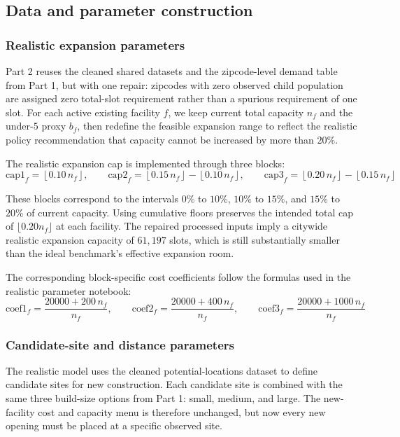 \documentclass[11pt]{article}
\newcommand{\1}{\mathbb{I}}
\begin{document}
\subsection{Data and parameter construction}

\subsubsection{Realistic expansion parameters}

Part 2 reuses the cleaned shared datasets and the zipcode-level demand table from Part 1, but with one repair: zipcodes with zero observed child population are assigned zero total-slot requirement rather than a spurious requirement of one slot. For each active existing facility \(f\), we keep current total capacity \(n_f\) and the under-\(5\) proxy \(b_f\), then redefine the feasible expansion range to reflect the realistic policy recommendation that capacity cannot be increased by more than \(20\%\).

The realistic expansion cap is implemented through three blocks:
\[
\mathrm{cap1}_f = \left\lfloor 0.10\,n_f \right\rfloor,\qquad
\mathrm{cap2}_f = \left\lfloor 0.15\,n_f \right\rfloor - \left\lfloor 0.10\,n_f \right\rfloor,\qquad
\mathrm{cap3}_f = \left\lfloor 0.20\,n_f \right\rfloor - \left\lfloor 0.15\,n_f \right\rfloor
\]

These blocks correspond to the intervals \(0\%\) to \(10\%\), \(10\%\) to \(15\%\), and \(15\%\) to \(20\%\) of current capacity. Using cumulative floors preserves the intended total cap of \(\lfloor 0.20 n_f \rfloor\) at each facility. The repaired processed inputs imply a citywide realistic expansion capacity of \(61{,}197\) slots, which is still substantially smaller than the ideal benchmark's effective expansion room.

The corresponding block-specific cost coefficients follow the formulas used in the realistic parameter notebook:
\[
\mathrm{coef1}_f = \frac{20000 + 200\,n_f}{n_f},\qquad
\mathrm{coef2}_f = \frac{20000 + 400\,n_f}{n_f},\qquad
\mathrm{coef3}_f = \frac{20000 + 1000\,n_f}{n_f}
\]

\subsubsection{Candidate-site and distance parameters}

The realistic model uses the cleaned potential-locations dataset to define candidate sites for new construction. Each candidate site is combined with the same three build-size options from Part 1: small, medium, and large. The new-facility cost and capacity menu is therefore unchanged, but now every new opening must be placed at a specific observed site.
\end{document}
